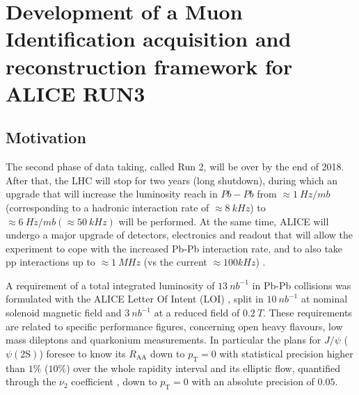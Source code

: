 \chapter{Development of a Muon Identification acquisition and reconstruction framework for ALICE RUN3}

\section{Motivation}
The second phase of data taking, called Run 2, will be over by the end of 2018. 
After that, the LHC will stop for two years (long shutdown), during which an upgrade that will increase the luminosity reach in $Pb-Pb$ from $\approx 1\ Hz/mb$ (corresponding to a hadronic interaction rate of $\approx8\ kHz$) to $\approx6\ Hz/mb (\approx50\ kHz)$ will be performed.
At the same time, ALICE will undergo a major upgrade of detectors, electronics and readout that will allow the experiment to cope with the increased Pb-Pb interaction rate, and to also take pp interactions up to $\approx1\ MHz$ (vs the current $\approx100 kHz$) \cite{Abelev:1625842, CERN-LHCC-2013-020, CERN-LHCC-2015-001, Antonioli:1603472, Buncic:2011297}.

A requirement of a total integrated luminosity of $13\ nb^{-1}$ in Pb-Pb collisions was formulated with the ALICE Letter Of Intent (LOI) \cite{ALICE_LOI}, split in $10\ nb^{-1}$ at nominal solenoid magnetic field and $3\ nb^{-1}$ at a reduced field of $0.2\ T$.
These requirements are related to specific performance figures, concerning open heavy flavours, low mass dileptons and quarkonium measurements.
In particular the plans for $J/\psi$ ($\psi(\mathrm{2S})$) foresee to know its $R_{\mathrm{AA}}$ down to $p_{\mathrm{T}} = 0$ with statistical precision higher than $1\%$ ($10\%$) over the whole rapidity interval and its elliptic flow, quantified through the $\nu_2$ coefficient \cite{Acharya:2017tgv}, down to $p_{\mathrm{T}} = 0$ with an absolute precision of $0.05$.

